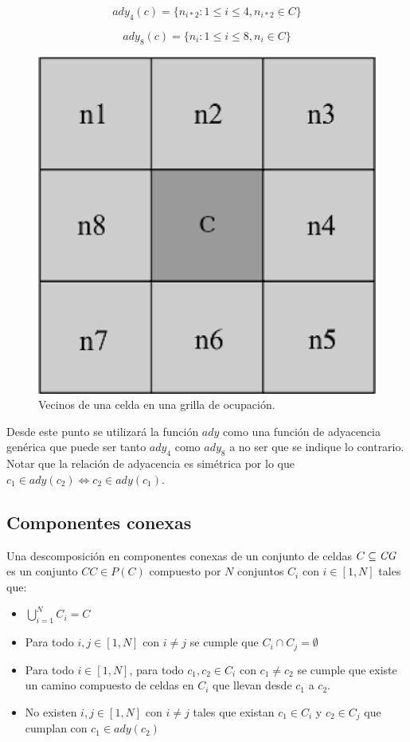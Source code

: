\begin{equation} 
 ady_4(c)=\{n_{i*2} : 1\leq i \leq 4, n_{i*2} \in C\}
 \label{eq:vecinos4}
\end{equation} 

\begin{equation} 
 ady_8(c)=\{n_i : 1\leq i \leq 8, n_i \in C\}
 \label{eq:vecinos8}
\end{equation} 

\begin{figure}[H]
  \center
  \includegraphics[width=0.3\linewidth]{imagenes/vecinosSharp.png}
  \caption[Vecinos de una celda en una grilla de ocupación.]{Vecinos de una celda en una grilla de ocupación.}
  \label{fig:vecinos}
\end{figure} 

Desde este punto se utilizará la función $ady$ como una función de adyacencia
genérica que puede ser tanto $ady_4$ como $ady_8$ a no ser que se indique lo
contrario.
Notar que la relación de adyacencia es simétrica por lo que $c_1 \in ady(c_2)
\Leftrightarrow c_2 \in ady(c_1)$.

\subsection{Componentes conexas} \label{subsec:CompComp}
Una descomposición en componentes conexas de un conjunto de
celdas $C \subseteq \mathit{CG}$ es un conjunto $CC\in P(C)$ compuesto por $N$ conjuntos $C_i$ con
$i\in[1,N]$ tales que:
\begin{itemize}
  \item $\bigcup_{i=1}^{N}C_i = C$ 
  \item Para todo $i,j \in [1,N]$ con $i\neq j$ se cumple que  $C_i\cap C_j = \emptyset$
  \item Para todo $i \in [1,N]$, para todo $c_1,c_2 \in C_i$ con $c_1 \neq c_2$
    se cumple que existe un camino compuesto de celdas en $C_i$ que llevan
    desde $c_1$ a $c_2$.
  \item No existen $i,j \in [1,N]$ con $i\neq j$ tales que existan $c_1 \in C_i$ y $c_2 \in C_j$ que cumplan con $c_1 \in ady(c_2)$ 
\end{itemize}

